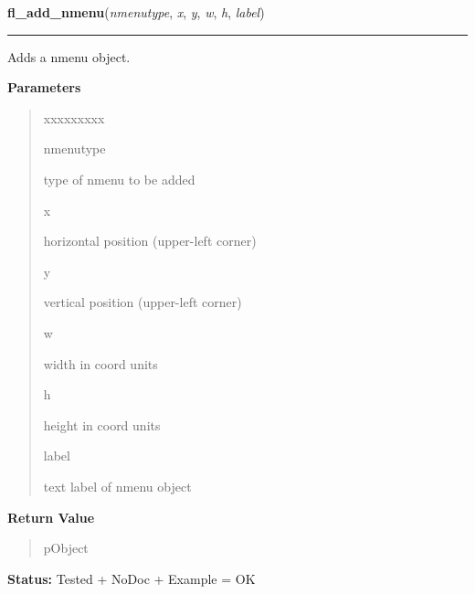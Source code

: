     \label{xformslib:library:fl_add_nmenu}

    \vspace{0.5ex}

\hspace{.8\funcindent}\begin{boxedminipage}{\funcwidth}

    \raggedright \textbf{fl\_add\_nmenu}(\textit{nmenutype}, \textit{x}, \textit{y}, \textit{w}, \textit{h}, \textit{label})

    \vspace{-1.5ex}

    \rule{\textwidth}{0.5\fboxrule}
\setlength{\parskip}{2ex}
    Adds a nmenu object.

\setlength{\parskip}{1ex}
      \textbf{Parameters}
      \vspace{-1ex}

      \begin{quote}
        \begin{Ventry}{xxxxxxxxx}

          \item[nmenutype]

          type of nmenu to be added

          \item[x]

          horizontal position (upper-left corner)

          \item[y]

          vertical position (upper-left corner)

          \item[w]

          width in coord units

          \item[h]

          height in coord units

          \item[label]

          text label of nmenu object

        \end{Ventry}

      \end{quote}

      \textbf{Return Value}
    \vspace{-1ex}

      \begin{quote}
      pObject

      \end{quote}

\textbf{Status:} Tested + NoDoc + Example = OK



    \end{boxedminipage}

